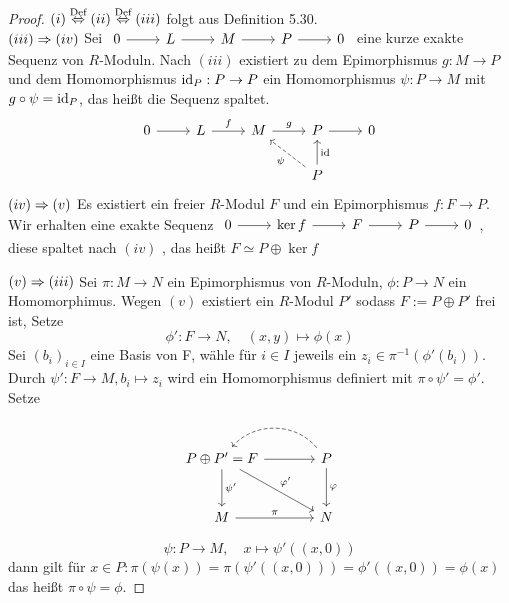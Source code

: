 \begin{proof}
	$(i) \overset{\text{Def}}{\Leftrightarrow} (ii) \overset{\text{Def}}{\Leftrightarrow} (iii) $ folgt aus Definition 5.30. \\
	$(iii) \Rightarrow (iv) $ Sei $\begin{tikzcd}
	0  \arrow{r} & L \arrow{r} & M \arrow{r} & P \arrow{r} & 0
	\end{tikzcd} $
	 eine kurze exakte Sequenz von $R$-Moduln. Nach $(iii)$ existiert zu dem Epimorphismus $ g: M \to P $ und dem Homomorphismus $\operatorname{id}_P: P \to P $ ein Homomorphismus $ \psi: P \to M $  mit $ g \circ \psi = \operatorname{id}_P$, das heißt die Sequenz spaltet. 
	 	$$\begin{tikzcd}
	 0 \arrow{r} & L \arrow{r}{f} & M \arrow{r}{g} & P \arrow{r} & 0 \\
	 & & & P \arrow[dashed]{ul}{\psi} \arrow[swap]{u}{\id} & 
	 \end{tikzcd}$$
	$(iv) \Rightarrow (v) $ Es existiert ein freier $R$-Modul $F$ und ein Epimorphismus $ f: F \to P $. Wir erhalten eine exakte Sequenz $\begin{tikzcd}
	0  \arrow{r} & \ker f \arrow{r} & F \arrow{r} & P \arrow{r} & 0
	\end{tikzcd} $, diese spaltet nach $(iv)$ , das heißt $ F \simeq P \oplus \ker f $\\
	
	\begin{minipage}[t]{0.7\textwidth}
		$(v) \Rightarrow (iii)$ Sei $ \pi: M \to N$ ein Epimorphismus von $R$-Moduln, $\phi: P \to N $ ein Homomorphimus. 
		Wegen $(v)$ existiert ein $R$-Modul $P' $ sodass $F:= P \oplus P' $ frei ist, Setze $$\phi': F \to N, \quad  (x,y) \mapsto \phi(x)$$
		Sei $ (b_i)_{i \in I} $ eine Basis von F, wähle für $i \in I $ jeweils ein $ z_i \in \pi^{-1}(\phi'(b_i)) .$ Durch $\psi': F \to M , b_i \mapsto z_i $ wird ein Homomorphismus definiert mit $ \pi \circ \psi' = \phi'.$ Setze
	\end{minipage}
	\begin{minipage}[t]{0.3\textwidth} 
		$$\begin{tikzcd}[column sep = large, row sep = large]
	P \oplus P' = F \arrow{dr}{\phi '} \arrow{d}{\psi'} \arrow{r} & P \arrow{d}{\phi} \arrow[dashed, bend right = 50]{l} \\
	M \arrow{r}{\pi} & N
	\end{tikzcd}$$
	\end{minipage}
 $$\psi: P \to M ,\quad  x \mapsto \psi'((x,0))$$ dann gilt für $x \in P: \pi(\psi(x)) = \pi(\psi'((x,0)))= \phi'((x,0)) = \phi(x) $ das heißt $\pi \circ \psi = \phi.$
\end{proof}
